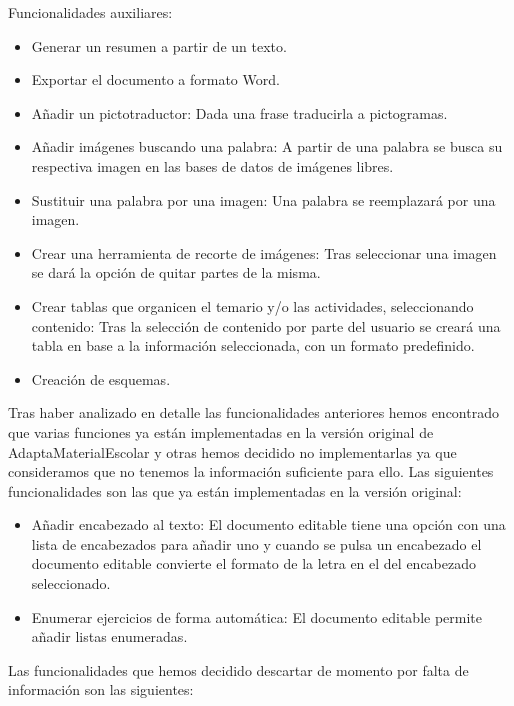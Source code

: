 Funcionalidades auxiliares:
\begin{itemize}
  \item Generar un resumen a partir de un texto.
  \item Exportar el documento a formato Word.
  \item Añadir un pictotraductor: Dada una frase traducirla a pictogramas.
  \item Añadir imágenes buscando una palabra: A partir de una palabra se busca su respectiva imagen en las bases de datos de imágenes libres.
  \item Sustituir una palabra por una imagen: Una palabra se reemplazará por una imagen.
  \item Crear una herramienta de recorte de imágenes: Tras seleccionar una imagen se dará la opción de quitar partes de la misma. 
  \item Crear tablas que organicen el temario y/o las actividades, seleccionando contenido: Tras la selección de contenido por parte del usuario se creará una tabla en base a la información seleccionada, con un formato predefinido.
  \item Creación de esquemas.
\end{itemize}
Tras haber analizado en detalle las funcionalidades anteriores hemos encontrado que varias funciones ya están implementadas en la versión original de AdaptaMaterialEscolar y otras hemos decidido no implementarlas ya que consideramos que no tenemos la información suficiente para ello. Las siguientes funcionalidades son las que ya están implementadas en la versión original:
  \begin{itemize}
    \item Añadir encabezado al texto: El documento editable tiene una opción con una lista de encabezados para añadir uno y cuando se pulsa un encabezado el documento editable convierte el formato de la letra en el del encabezado seleccionado. 
    \item Enumerar ejercicios de forma automática: El documento editable permite añadir listas enumeradas.
  \end{itemize}
Las funcionalidades que hemos decidido descartar de momento por falta de información son las siguientes:
